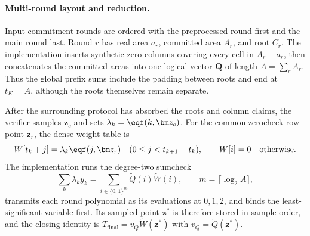 \paragraph{Multi-round layout and reduction.} Input-commitment rounds are
ordered with the preprocessed round first and the main round last. Round $r$
has real area $a_r$, committed area $A_r$, and root $C_r$. The implementation
inserts synthetic zero columns covering every cell in $A_r-a_r$, then
concatenates the committed areas into one logical vector $\mathbf Q$ of length
$A=\sum_r A_r$. Thus the global prefix sums include the padding between roots
and end at $t_K=A$, although the roots themselves remain separate.

After the surrounding protocol has absorbed the roots and column claims, the
verifier samples $\bm z_c$ and sets $\lambda_k=\eqf(k,\bm z_c)$. For the
common zerocheck row point $\bm z_r$, the dense weight table is
\[
  W[t_k+j]=\lambda_k\eqf(j,\bm z_r)
  \quad(0\le j<t_{k+1}-t_k),
  \qquad W[i]=0\quad\text{otherwise}.
\]
The implementation runs the degree-two sumcheck
\[
  \sum_k\lambda_k y_k
  =\sum_{i\in\{0,1\}^m}\widetilde Q(i)\widetilde W(i),
  \qquad m=\lceil\log_2 A\rceil,
\]
transmits each round polynomial as its evaluations at $0,1,2$, and binds the
least-significant variable first. Its sampled point $\bm z^*$ is therefore
stored in sample order, and the closing identity is
$T_{\mathrm{final}}=v_Q\widetilde W(\bm z^*)$ with
$v_Q=\widetilde Q(\bm z^*)$.

